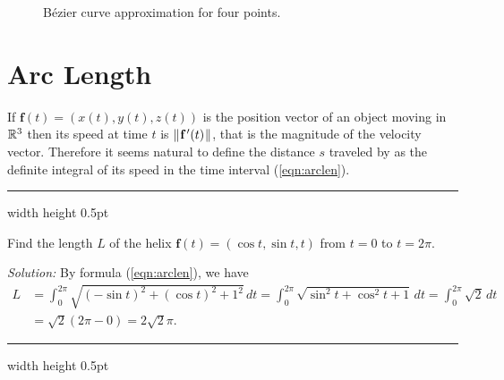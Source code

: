 \begin{figure}[h]
  \begin{center}
   
  \end{center}\vspace{-0mm}
 \caption[]{\quad B\'{e}zier curve approximation for four points.}
 \label{fig:bezier3}
 \end{figure}
 
\newpage
\section{Arc Length}

If $\textbf{f}(t) = (x(t),y(t),z(t))$ is the position vector of an object moving in $\mathbb{R}^{3}$ then 
its speed at time $t$ is $\lVert\mspace{1mu}\textbf{f}\,'(t)\mspace{1mu}\rVert$,
that is the magnitude  of the velocity vector.
Therefore it seems natural to define the distance $s$
traveled by as the definite integral of its speed in the time interval (\ref{eqn:arclen}).

\vspace{2mm}
\hrule width \textwidth height 0.5pt
\begin{exmp}\label{exmp:arclenhelix}
 Find the length $L$ of the helix $\textbf{f}(t) = ( \cos t , \sin t , t )$ from $t = 0$ to $t =
 2\pi$.\vspace{1mm}
 \par\noindent \emph{Solution:} 
 By formula (\ref{eqn:arclen}), we have
 \begin{align*}
  L &= \int_{0}^{2\pi} \sqrt{(-\sin t)^2 + (\cos t)^2 + 1^2}\,dt 
  = \int_{0}^{2\pi} \sqrt{\sin^2 t + \cos^2 t + 1}\,dt 
  = \int_{0}^{2\pi} \sqrt{2}\,dt\\
  &= \sqrt{2} (2\pi - 0) = 2\sqrt{2}\pi.
 \end{align*}
\end{exmp}
\hrule width \textwidth height 0.5pt
\vspace{2mm}

